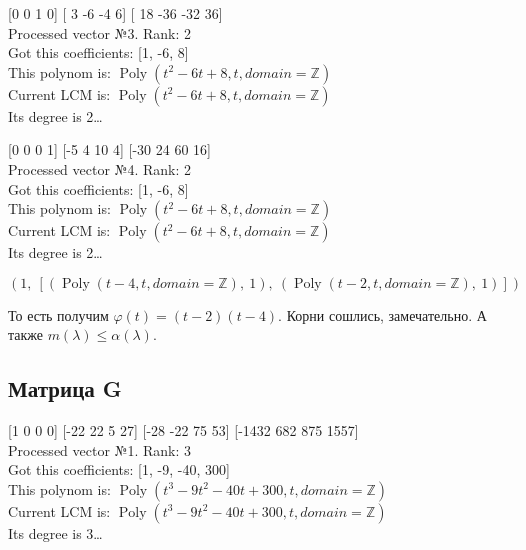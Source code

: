 \documentclass[12pt, a4paper]{article}
\begin{document}
    [0 0 1 0] [ 3 -6 -4  6] [ 18 -36 -32  36] \\
    Processed vector №3. Rank: 2\\
    Got this coefficients: [1, -6, 8]\\
    This polynom is: $\operatorname{Poly}{\left( t^{2} - 6 t + 8, t, domain=\mathbb{Z} \right)}$\\
    Current LCM is: $\operatorname{Poly}{\left( t^{2} - 6 t + 8, t, domain=\mathbb{Z} \right)}$\\
    Its degree is 2…
    
    [0 0 0 1] [-5  4 10  4] [-30  24  60  16] \\
    Processed vector №4. Rank: 2\\
    Got this coefficients: [1, -6, 8]\\
    This polynom is: $\operatorname{Poly}{\left( t^{2} - 6 t + 8, t, domain=\mathbb{Z} \right)}$\\
    Current LCM is: $\operatorname{Poly}{\left( t^{2} - 6 t + 8, t, domain=\mathbb{Z} \right)}$\\
    Its degree is 2…
    
    \begin{equation}\left( 1, \  \left[ \left( \operatorname{Poly}{\left( t - 4, t, domain=\mathbb{Z} \right)}, \  1\right), \  \left( \operatorname{Poly}{\left( t - 2, t, domain=\mathbb{Z} \right)}, \  1\right)\right]\right)\end{equation}
    
    То есть получим $\varphi(t) = (t - 2)(t - 4)$.
    Корни сошлись, замечательно. А также $m(\lambda) \leqslant \alpha(\lambda)$.



    \subsection{Матрица G}

    [1 0 0 0] [-22  22   5  27] [-28 -22  75  53] [-1432   682   875  1557] \\
    Processed vector №1. Rank: 3\\
    Got this coefficients: [1, -9, -40, 300]\\
    This polynom is: $\operatorname{Poly}{\left( t^{3} - 9 t^{2} - 40 t + 300, t, domain=\mathbb{Z} \right)}$\\
    Current LCM is: $\operatorname{Poly}{\left( t^{3} - 9 t^{2} - 40 t + 300, t, domain=\mathbb{Z} \right)}$\\
    Its degree is 3…
    
\end{document}
